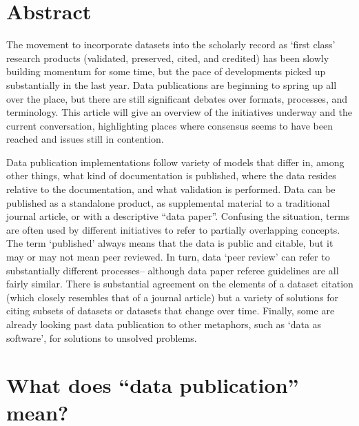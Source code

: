 \documentclass{article}
\begin{document}
\section{Abstract}\label{abstract}

The movement to incorporate datasets into the scholarly record as `first class' research products (validated, preserved, cited, and credited) has been slowly building momentum for some time, but the pace of developments picked up substantially in the last year.
Data publications are beginning to spring up all over the place, but there are still significant debates over formats, processes, and terminology.
This article will give an overview of the initiatives underway and the current conversation, highlighting places where consensus seems to have been reached and issues still in contention.

Data publication implementations follow variety of models that differ in, among other things, what kind of documentation is published, where the data resides relative to the documentation, and what validation is performed.
Data can be published as a standalone product, as supplemental material to a traditional journal article, or with a descriptive ``data paper''.
Confusing the situation, terms are often used by different initiatives to refer to partially overlapping concepts. The term `published' always means that the data is public and citable, but it may or may not mean peer reviewed.
In turn, data `peer review' can refer to substantially different processes-- although data paper referee guidelines are all fairly similar. There is substantial agreement on the elements of a dataset citation (which closely resembles that of a journal article) but a variety of solutions for citing subsets of datasets or datasets that change over time.
Finally, some are already looking past data publication to other metaphors, such as `data as software', for solutions to unsolved problems.

\section{What does ``data publication'' mean?}\label{what-does-data-publication-mean}
\end{document}
